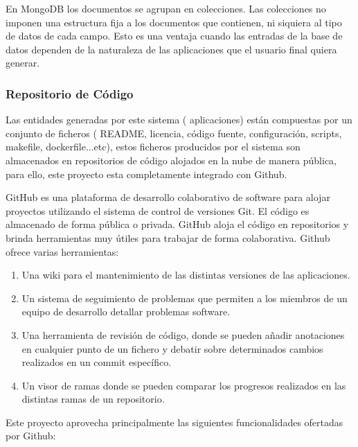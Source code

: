 \documentclass[a4paper,11pt]{book}
\begin{document}
En MongoDB los documentos se agrupan en colecciones. Las colecciones  no imponen una estructura fija a los documentos que contienen, ni siquiera al tipo de datos de cada campo. Esto es una ventaja cuando las entradas de la base de datos dependen de la naturaleza de las aplicaciones que el usuario final quiera generar.  


\subsubsection{Repositorio de Código}

Las entidades generadas por este sistema ( aplicaciones) están compuestas por un conjunto de ficheros ( README, licencia, código fuente, configuración, scripts, makefile, dockerfile...etc), estos ficheros producidos por el sistema son almacenados en repositorios de código alojados en la nube de manera pública, para ello, este proyecto esta completamente integrado con Github\cite{github}. 

GitHub\cite{github} es una plataforma de desarrollo colaborativo de software para alojar proyectos utilizando el sistema de control de versiones Git. El código es almacenado de forma pública o privada. GitHub aloja el código en repositorios y brinda herramientas muy útiles para trabajar de forma colaborativa. Github\cite{github2} ofrece varias herramientas:

\begin{enumerate}
\item Una wiki para el mantenimiento de las distintas versiones de las aplicaciones. 
\item Un sistema de seguimiento de problemas que permiten a los miembros de un equipo de desarrollo detallar problemas software.
\item Una herramienta de revisión de código, donde se pueden añadir anotaciones en cualquier punto de un fichero y debatir sobre determinados cambios realizados en un commit específico. 
\item Un visor de ramas donde se pueden comparar los progresos realizados en las distintas ramas de un repositorio. 
\end{enumerate}   


Este proyecto aprovecha principalmente las siguientes funcionalidades ofertadas por Github:
\end{document}
